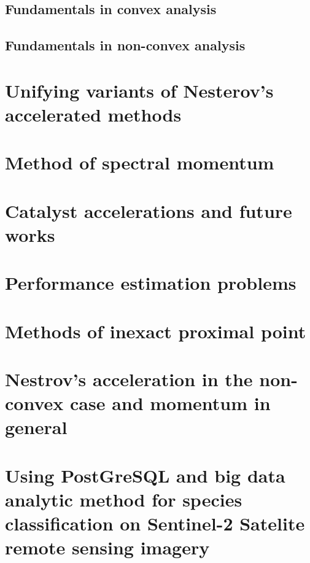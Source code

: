 \documentclass[12pt]{article}
\begin{document}
    \subsection{Fundamentals in convex analysis}
    \subsection{Fundamentals in non-convex analysis}

\section{Unifying variants of Nesterov's accelerated methods}\label{sec:unify-nes-acceleration}

\section{Method of spectral momentum}\label{sec:spectral-momentum}

\section{Catalyst accelerations and future works}\label{sec:catalyst}

\section{Performance estimation problems}\label{sec:pep}

\section{Methods of inexact proximal point}\label{sec:inexact-prox}

\section{Nestrov's acceleration in the non-convex case and momentum in general}\label{sec:nes-acc-ncnvx}

\section{Using PostGreSQL and big data analytic method for species classification on Sentinel-2 Satelite remote sensing imagery}




\newpage

\appendix
\end{document}
